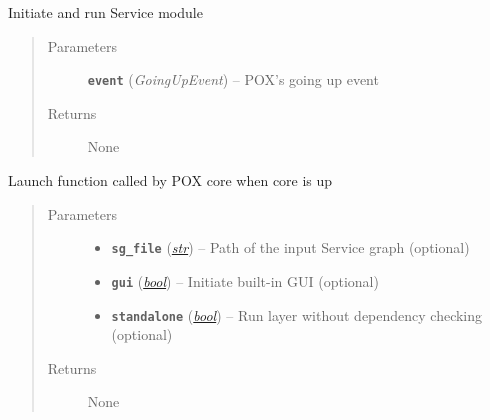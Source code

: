 \documentclass[letterpaper,10pt,english]{sphinxmanual}
\begin{document}
\begin{fulllineitems}
\label{service:service._start_layer}
Initiate and run Service module
\begin{quote}\begin{description}
\item[{Parameters}] \leavevmode
\textbf{\texttt{event}} (\emph{GoingUpEvent}) -- POX's going up event

\item[{Returns}] \leavevmode
None

\end{description}\end{quote}

\end{fulllineitems}


\begin{fulllineitems}
\label{service:service.launch}
Launch function called by POX core when core is up
\begin{quote}\begin{description}
\item[{Parameters}] \leavevmode\begin{itemize}
\item {} 
\textbf{\texttt{sg\_file}} (\href{https://docs.python.org/2.7/library/functions.html\#str}{\emph{str}}) -- Path of the input Service graph (optional)

\item {} 
\textbf{\texttt{gui}} (\href{https://docs.python.org/2.7/library/functions.html\#bool}{\emph{bool}}) -- Initiate built-in GUI (optional)

\item {} 
\textbf{\texttt{standalone}} (\href{https://docs.python.org/2.7/library/functions.html\#bool}{\emph{bool}}) -- Run layer without dependency checking (optional)

\end{itemize}

\item[{Returns}] \leavevmode
None

\end{description}\end{quote}

\end{fulllineitems}
\end{document}
